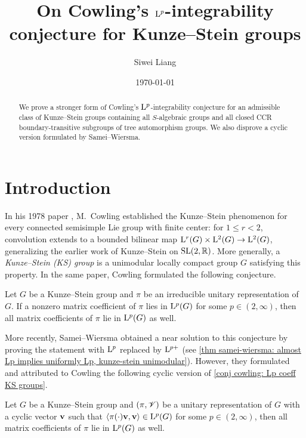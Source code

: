\documentclass[a4paper, 10pt]{article}
\title{On Cowling's $\mathrm{L}^p$-integrability conjecture for Kunze--Stein groups}
\author{Siwei Liang}
\date{\today}
\begin{document}
    \maketitle
    \begin{abstract}
        We prove a stronger form of Cowling's $\mathrm{L}^p$-integrability conjecture for an admissible class of Kunze--Stein groups containing all $S$-algebraic groups and all closed CCR boundary-transitive subgroups of tree automorphism groups. We also disprove a cyclic version formulated by Samei--Wiersma.
    \end{abstract}

\section{Introduction}
    In his 1978 paper \cite{cowling1978the-kunze-stein}, M.~Cowling established the Kunze--Stein phenomenon for every connected semisimple Lie group with finite center: for $1\leq r<2$, convolution extends to a bounded bilinear map $\mathrm{L}^r(G) \times \mathrm{L}^2(G) \to \mathrm{L}^2(G)$, generalizing the earlier work of Kunze--Stein \cite{kunze-stein1960uniformly} on $\operatorname{SL}(2,\mathbb{R})$.
    More generally, a \emph{Kunze--Stein (KS) group} is a unimodular locally compact group $G$ satisfying this property.
    In the same paper, Cowling formulated the following conjecture.
    \begin{conjecture}\label{conj cowling: Lp coeff KS groups}
        Let $G$ be a Kunze--Stein group and $\pi$ be an irreducible unitary representation of $G$. If a nonzero matrix coefficient of $\pi$ lies in $\mathrm{L}^p(G)$ for some $p\in (2,\infty)$, then all matrix coefficients of $\pi$ lie in $\mathrm{L}^p(G)$ as well.
    \end{conjecture}

    More recently, Samei--Wiersma \cite{samei-wiersma2024exotic} obtained a near solution to this conjecture by proving the statement with $\mathrm{L}^p$ replaced by $\mathrm{L}^{p+}$ (see \autoref{thm samei-wiersma: almost Lp implies uniformly Lp, kunze-stein unimodular}). However, they formulated and attributed to Cowling the following cyclic version of \autoref{conj cowling: Lp coeff KS groups}.
    \begin{conjecture}\label{conj samei-wiersma: cyclic}
        Let $G$ be a Kunze--Stein group and $(\pi, \mathscr{V})$ be a unitary representation of $G$ with a cyclic vector $\mathbf{v}$ such that $\left\langle\pi(\cdot)\mathbf{v},\mathbf{v} \right\rangle\in \mathrm{L}^p(G)$ for some $p\in (2,\infty)$, then all matrix coefficients of $\pi$ lie in $\mathrm{L}^p(G)$ as well.
    \end{conjecture}
\end{document}
